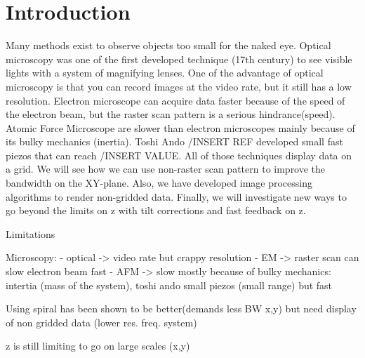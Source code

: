 \chapter{Introduction}

Many methods exist to observe objects too small for the naked eye. Optical microscopy was one of the first developed technique (17th century) to see visible lights with a system of magnifying lenses. One of the advantage of optical microscopy is that you can record images at the video rate, but it still has a low resolution.
Electron microscope can acquire data faster because of the speed of the electron beam, but the raster scan pattern is a serious hindrance(speed). Atomic Force Microscope are slower than electron microscopes mainly because of its bulky mechanics (inertia). Toshi Ando /INSERT REF developed small fast piezos that can reach /INSERT VALUE. All of those techniques display data on a grid. We will see how we can use non-raster scan pattern to improve the bandwidth on the XY-plane. Also, we have developed image processing algorithms to render non-gridded data. Finally, we will investigate new ways to go beyond the limits on z with tilt corrections and fast feedback on z.



Limitations

Microscopy:
	- optical -> video rate but crappy resolution
	- EM -> raster scan can slow electron beam fast
	- AFM -> slow mostly because of bulky mechanics: intertia (mass of the system), toshi ando small piezos (small range) but fast

Using spiral has been shown to be better(demands less BW x,y) but need display of non gridded data (lower res. freq. system)

z is still limiting to go on large scales (x,y)